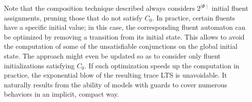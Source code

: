 Note that the composition technique described always considers $2^{\mid\Phi\mid}$ initial fluent assignments, pruning those that do not satisfy $C_0$. In practice, certain fluents have a specific initial value; in this case, the corresponding fluent automaton can be optimized by removing a transition from its initial state. This allows to avoid the computation of some of the unsatisfiable conjunctions on the global initial state. The approach might even be updated so as to consider only fluent initializations satisfying $C_0$. If such optimization speeds up the computation in practice, the exponential blow of the resulting trace LTS is unavoidable. It naturally results from the ability of models with guards to cover numerous behaviors in an implicit, compact way. 
